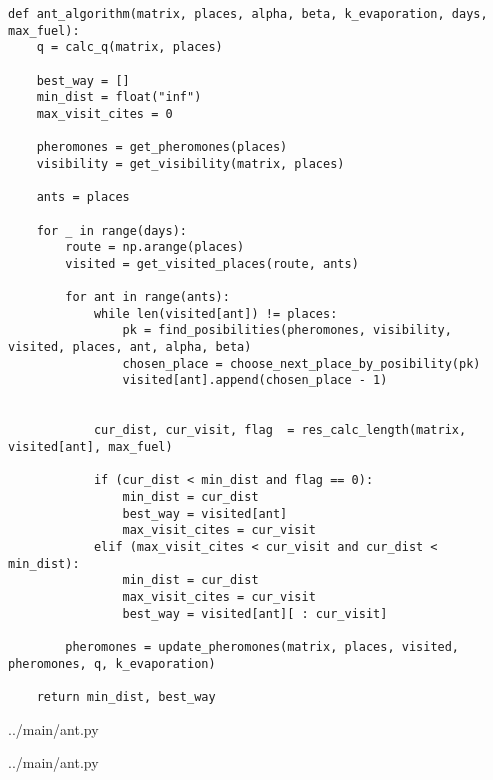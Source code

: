 \begin{lstlisting}[label=lst:ant_alg,caption=Релизация муравьиного алгоритма]
    def ant_algorithm(matrix, places, alpha, beta, k_evaporation, days, max_fuel):
    q = calc_q(matrix, places)

    best_way = []
    min_dist = float("inf")
    max_visit_cites = 0

    pheromones = get_pheromones(places)
    visibility = get_visibility(matrix, places)

    ants = places

    for _ in range(days):
        route = np.arange(places)
        visited = get_visited_places(route, ants)

        for ant in range(ants):
            while len(visited[ant]) != places:
                pk = find_posibilities(pheromones, visibility, visited, places, ant, alpha, beta)
                chosen_place = choose_next_place_by_posibility(pk)
                visited[ant].append(chosen_place - 1)


            cur_dist, cur_visit, flag  = res_calc_length(matrix, visited[ant], max_fuel)

            if (cur_dist < min_dist and flag == 0):
                min_dist = cur_dist
                best_way = visited[ant]
                max_visit_cites = cur_visit
            elif (max_visit_cites < cur_visit and cur_dist < min_dist):
                min_dist = cur_dist
                max_visit_cites = cur_visit
                best_way = visited[ant][ : cur_visit]

        pheromones = update_pheromones(matrix, places, visited, pheromones, q, k_evaporation)

    return min_dist, best_way
\end{lstlisting}

\noindent
\begin{minipage}{\linewidth}
\begin{lstinputlisting}[
	caption={Алгоритм нахождения массива вероятностных переходов в непосещенные города},
	label={lst:prob},
	linerange={59-76}
]{../main/ant.py}
\end{lstinputlisting}
\end{minipage}

\noindent
\begin{minipage}{\linewidth}
\begin{lstinputlisting}[
	caption={Алгоритм нахождения следующего города на основании рандома},
	label={lst:rand},
	linerange={78-86}
]{../main/ant.py}
\end{lstinputlisting}
\end{minipage}

